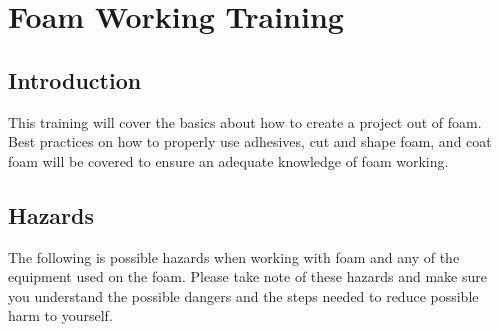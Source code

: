 \chapter{Foam Working Training} \label{foam_training}

\section{Introduction}

This training will cover the basics about how to create a project out of foam. Best practices on how to properly use adhesives, cut and shape foam, and coat foam will be covered to ensure an adequate knowledge of foam working.
\section{Hazards}

The following is possible hazards when working with foam and any of the equipment used on the foam.  Please take note of these hazards and make sure you understand the possible dangers and the steps needed to reduce possible harm to yourself.

